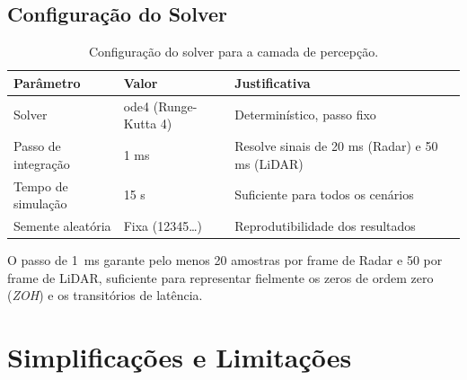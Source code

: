 \documentclass[12pt,a4paper]{article}
\begin{document}
\subsection{Configura\c{c}\~ao do Solver}

\begin{table}[H]
\centering
\caption{Configura\c{c}\~ao do solver para a camada de percep\c{c}\~ao.}
\begin{tabularx}{\linewidth}{lXX}
\toprule
\rowcolor{azulescuro}
\color{white}\textbf{Par\^ametro} &
\color{white}\textbf{Valor} &
\color{white}\textbf{Justificativa} \\
\midrule
\rowcolor{azulclaro!40}
Solver & ode4 (Runge-Kutta 4) & Determin\'istico, passo fixo \\
Passo de integra\c{c}\~ao & 1 ms & Resolve sinais de 20 ms (Radar) e 50 ms (LiDAR) \\
\rowcolor{azulclaro!40}
Tempo de simula\c{c}\~ao & 15 s & Suficiente para todos os cen\'arios \\
Semente aleat\'oria & Fixa (12345\ldots) & Reprodutibilidade dos resultados \\
\bottomrule
\end{tabularx}
\end{table}

\begin{notabox}
O passo de 1~ms garante pelo menos 20 amostras por frame de Radar e 50 por frame
de LiDAR, suficiente para representar fielmente os zeros de ordem zero (\textit{ZOH})
e os transitórios de latência.
\end{notabox}

\section{Simplifica\c{c}\~oes e Limita\c{c}\~oes}
\end{document}
